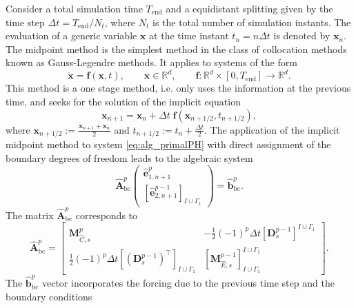 \documentclass{elsarticle}
\newcommand{\bbR}{\mathbb{R}}
\newcommand*{\dual}[1]{\ensuremath{\widehat{#1}}}
\begin{document}
Consider a total simulation time $T_{\mathrm{end}}$ and a equidistant splitting given by the time step $\Delta t = T_{\mathrm{end}}/N_t$, where $N_t$ is the total number of simulation instants. The evaluation of a generic variable $\mathbf{x}$ at the time instant $t_n = n\Delta t$ is denoted by $\mathbf{x}_n$. The midpoint method is the simplest method in the class of collocation methods known as Gauss-Legendre methods. It applies to systems of the form
\begin{equation}
    \dot{\mathbf{x}} = \mathbf{f}(\mathbf{x}, t), \qquad \mathbf{x} \in \bbR^d, \qquad \mathbf{f}: \bbR^{d} \times [0, T_{\mathrm{end}}] \rightarrow \bbR^d.
\end{equation}
This method is a one stage method, i.e. only uses the information at the previous time, and seeks for the solution of the implicit equation
\begin{equation}
    \mathbf{x}_{n+1} = \mathbf{x}_{n} + \Delta t \; \mathbf{f}\left(\mathbf{x}_{n+1/2},  t_{n+1/2}\right),
\end{equation}
where $\mathbf{x}_{n+1/2}:= \frac{\mathbf{x}_{n+1} + \mathbf{x}_{n}}{2}$ and $t_{n+1/2}:= t_n + \frac{\Delta t}{2}$. The application of the implicit midpoint method to system \eqref{eq:alg_primalPH} with direct assignment of the boundary degrees of freedom leads to the algebraic system
\begin{equation}\label{eq:timediscr_primal}
    \dual{\mathbf{A}}^{p}_{\mathrm{bc}}
    \begin{pmatrix}
    \dual{\mathbf{e}}^p_{1, n+1} \\ [\dual{\mathbf{e}}^{p-1}_{2, n+1}]_{I\cup \Gamma_1}
    \end{pmatrix}
    = \dual{\mathbf{b}}^{p}_{\mathrm{bc}}.
\end{equation}
The matrix $\dual{\mathbf{A}}^{p}_{\mathrm{bc}}$ corresponds to 
\begin{equation}
\dual{\mathbf{A}}^{p}_{\mathrm{bc}} =
    \begin{bmatrix}
        \mathbf{M}^p_{\dual{C}, s} & -\frac{1}{2}(-1)^p\Delta t [\mathbf{D}^{p-1}_s]^{I\cup \Gamma_1} \\
        \frac{1}{2}(-1)^p\Delta t [(\mathbf{D}_{s}^{p-1})^\top]_{I\cup \Gamma_1} & [\mathbf{M}^{p-1}_{\dual{E}, s}]_{I\cup \Gamma_1}^{I\cup \Gamma_1}
    \end{bmatrix}.
\end{equation}
The $\dual{\mathbf{b}}^{p}_{\mathrm{bc}}$ vector incorporates the forcing due to the previous time step and the boundary conditions
\end{document}
